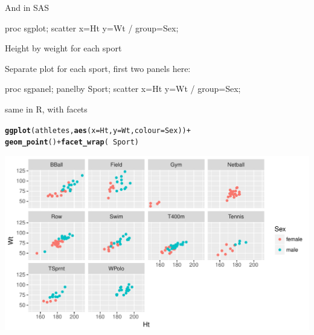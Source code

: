 \documentclass[unknownkeysallowed]{beamer}\usepackage[]{graphicx}\usepackage[]{color}
\makeatletter
\def\maxwidth{ %
  \ifdim\Gin@nat@width>\linewidth
    \linewidth
  \else
    \Gin@nat@width
  \fi
}
\newcommand{\hlopt}[1]{\textcolor[rgb]{0,0,0}{#1}}%
\newcommand{\hlstd}[1]{\textcolor[rgb]{0.345,0.345,0.345}{#1}}%
\newcommand{\hlkwc}[1]{\textcolor[rgb]{0.333,0.667,0.333}{#1}}%
\newcommand{\hlkwd}[1]{\textcolor[rgb]{0.737,0.353,0.396}{\textbf{#1}}}%
\newenvironment{kframe}{%
 \def\at@end@of@kframe{}%
 \ifinner\ifhmode%
  \def\at@end@of@kframe{\end{minipage}}%
  \begin{minipage}{\columnwidth}%
 \fi\fi%
 \def\FrameCommand##1{\hskip\@totalleftmargin \hskip-\fboxsep
 \colorbox{shadecolor}{##1}\hskip-\fboxsep
     \hskip-\linewidth \hskip-\@totalleftmargin \hskip\columnwidth}%
 \MakeFramed {\advance\hsize-\width
   \@totalleftmargin\z@ \linewidth\hsize
   \@setminipage}}%
 {\par\unskip\endMakeFramed%
 \at@end@of@kframe}
\newenvironment{knitrout}{}{} %
\makeatother
\begin{document}
\begin{frame}[fragile]{And in SAS}
  
  \begin{Sascode}[store=gk]
proc sgplot;
  scatter x=Ht y=Wt / group=Sex;
  \end{Sascode}
  
  
\end{frame}

\begin{frame}[fragile]{Height by weight for each sport}
  
  Separate plot for each sport, first two panels here:
  
  \begin{Sascode}[store=gl]
proc sgpanel;
  panelby Sport;
  scatter x=Ht y=Wt / group=Sex;
  \end{Sascode}
  
  
  
\end{frame}

\begin{frame}[fragile]{same in R, with facets}
  
\begin{knitrout}
\color{fgcolor}\begin{kframe}
\begin{alltt}
\hlkwd{ggplot}\hlstd{(athletes,}\hlkwd{aes}\hlstd{(}\hlkwc{x}\hlstd{=Ht,}\hlkwc{y}\hlstd{=Wt,}\hlkwc{colour}\hlstd{=Sex))}\hlopt{+}
  \hlkwd{geom_point}\hlstd{()}\hlopt{+}\hlkwd{facet_wrap}\hlstd{(}\hlopt{~}\hlstd{Sport)}
\end{alltt}
\end{kframe}
\includegraphics[width=\maxwidth]{figure/unnamed-chunk-32-1} 

\end{knitrout}
  
  
\end{frame}
\end{document}
